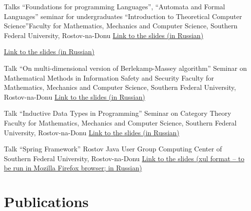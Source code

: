 \documentclass[11pt,a4paper]{moderncv}   %
\newcommand{\myhref}[2]{\textcolor{blue}{\href{#1}{#2}}}
\begin{document}

%
    {Talks “Foundations for programming Languages”, “Automata and Formal Languages”}%
    {seminar for undergraduates “Introduction to Theoretical Computer Science”}{Faculty for Mathematics, Mechanics and Computer Science, Southern Federal University, Rostov-na-Donu}{}%
    {\myhref{http://mmcs.sfedu.ru/~ulysses/Papers/Talks/2011-ITCS-FPL.pdf}{Link to the slides (in Russian)}}

%
    {\myhref{http://mmcs.sfedu.ru/~ulysses/Papers/Talks/2009-10-19-hoc-model-checking.pdf}{Link to the slides (in Russian)}}

%
    {Talk “On multi-dimensional version of Berlekamp-Massey algorithm”}%
    {Seminar on Mathematical Methods in Information Safety and Security}%
    {Faculty for Mathematics, Mechanics and Computer Science, Southern Federal University, Rostov-na-Donu}%
    {}%
    {\myhref{http://mmcs.sfedu.ru/~ulysses/Papers/Talks/2009-10-16,30-bmsa.pdf}{Link to the slides (in Russian)}}

%
    {Talk “Inductive Data Types in Programming”}%
    {Seminar on Category Theory}%
    {Faculty for Mathematics, Mechanics and Computer Science, Southern Federal University, Rostov-na-Donu}%
    {}%
    {\myhref{http://mmcs.sfedu.ru/~ulysses/Papers/Talks/2009-03-19-CT-inducttypes.pdf}{Link to the slides (in Russian)}}


%
    {Talk “Spring Framework”}%
    {Rostov Java User Group}%
    {Computing Center of Southern Federal University, Rostov-na-Donu}%
    {}%
    {\myhref{http://mmcs.sfedu.ru/~ulysses/Papers/Talks/2008-RostovJUG-SpringFramework.zip}{Link to the slides (xul format -- to be run in Mozilla Firefox browser; in Russian)}}

\section{Publications}

\end{document}
